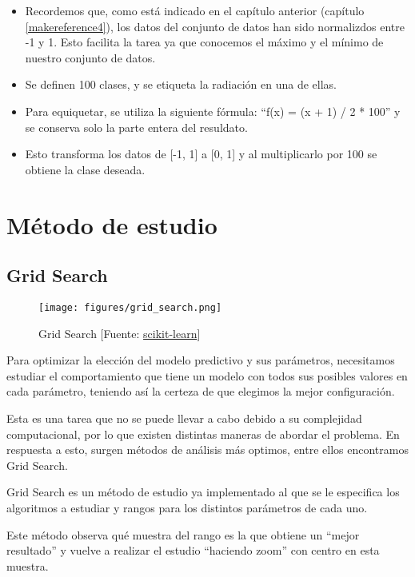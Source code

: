 	\begin{itemize}
		\item Recordemos que, como está indicado en el capítulo anterior (capítulo \ref{makereference4}), los datos del conjunto de datos han sido normalizdos entre -1 y 1. Esto facilita la tarea ya que conocemos el máximo y el mínimo de nuestro conjunto de datos.
		\item Se definen 100 clases, y se etiqueta la radiación en una de ellas.
		\item Para equiquetar, se utiliza la siguiente fórmula: ``f(x) = (x + 1) / 2 * 100'' y se conserva solo la parte entera del resuldato.
		\item Esto transforma los datos de [-1, 1] a [0, 1] y al multiplicarlo por 100 se obtiene la clase deseada. 
	\end{itemize}

\section{Método de estudio}
\label{makereference5.4}
	\subsection{Grid Search}

	\begin{figure}[htb]
		\begin{center}
			\texttt{[image: figures/grid\_search.png]}
			\caption{Grid Search [Fuente: \href{www.scikit-learn.org}{scikit-learn}] \label{grid}}
		\end{center}
	\end{figure}

	Para optimizar la elección del modelo predictivo y sus parámetros, necesitamos estudiar el comportamiento que tiene un modelo con todos sus posibles valores en cada parámetro, teniendo así la certeza de que elegimos la mejor configuración.

	Esta es una tarea que no se puede llevar a cabo debido a su complejidad computacional, por lo que existen distintas maneras de abordar el problema. En respuesta a esto, surgen métodos de análisis más optimos, entre ellos encontramos Grid Search.

	Grid Search es un método de estudio ya implementado al que se le especifica los algoritmos a estudiar y rangos para los distintos parámetros de cada uno. 

	Este método observa qué muestra del rango es la que obtiene un ``mejor resultado'' y vuelve a realizar el estudio ``haciendo zoom'' con centro en esta muestra.

